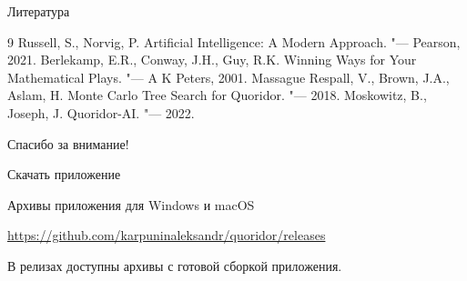 \documentclass[fullscreen=true,russian,compress,%
    hyperref={unicode,bookmarks=false}]{presentation}
\begin{document}
\begin{frame}{Литература}
\begin{thebibliography}{9}
Russell, S., Norvig, P.
\newblock Artificial Intelligence: A Modern Approach. "--- Pearson, 2021.
Berlekamp, E.R., Conway, J.H., Guy, R.K.
\newblock Winning Ways for Your Mathematical Plays. "--- A K Peters, 2001.
Massague Respall, V., Brown, J.A., Aslam, H.
\newblock Monte Carlo Tree Search for Quoridor. "--- 2018.
Moskowitz, B., Joseph, J.
\newblock Quoridor-AI. "--- 2022.
\end{thebibliography}
\end{frame}

\begin{frame}{}
\begin{center}
\vspace{1.2cm}
{\LARGE Спасибо за внимание!}

\vspace{.8cm}
\end{center}
\end{frame}

\begin{frame}{Скачать приложение}
\begin{center}
\vspace{.8cm}
{\Large Архивы приложения для Windows и macOS}

\vspace{.6cm}
{\large \url{https://github.com/karpuninaleksandr/quoridor/releases}}

\vspace{.6cm}
\small
В релизах доступны архивы с готовой сборкой приложения.
\end{center}
\end{frame}
\end{document}
